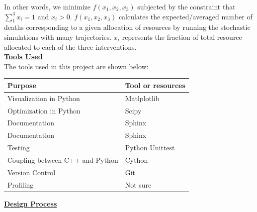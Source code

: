\documentclass[11pt,letter]{article}
\begin{document}
In other words, we minimize $f(x_1,x_2,x_3)$ subjected by the constraint that $\sum\limits_{1}^{3}x_i=1$ and $x_i>0$. $f(x_1,x_2,x_3)$ calculates the expected/averaged number of deaths corresponding to a given allocation of resources by running the stochastic simulations with many trajectories. $x_i$ represents the fraction of total resource allocated to each of the three interventions. \\

\underline{\textbf{Tools Used}}\vspace{-0.5mm}\\

The tools used in this project are shown below:


\begin{center}
\centering
	\begin{tabular}{ l | p{13cm}}
           \textbf{Purpose} & \textbf{Tool or resources} \\ \hline
	Visualization in Python & Matlplotlib \\
	Optimization in Python & Scipy \\
	Documentation  & Sphinx \\
	Documentation  & Sphinx \\
         Testing  & Python Unittest \\
         Coupling between C++ and Python & Cython \\
         Version Control & Git \\
         Profiling & Not sure 
         
	\end{tabular}
\end{center}

\underline{\textbf{Design Process}}\vspace{0.5mm}\\
\end{document}
